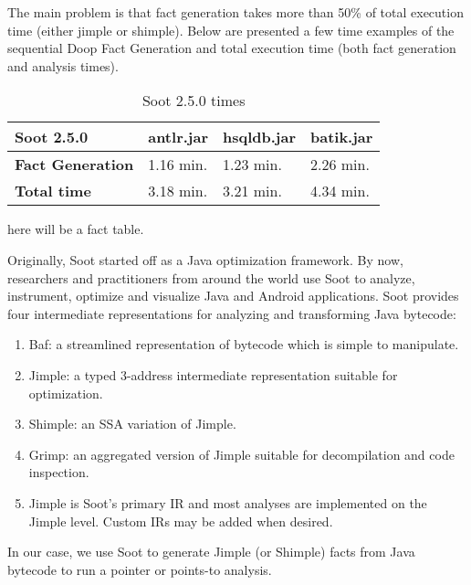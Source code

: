 \documentclass{dithesis}
\begin{document}
        The main problem is that fact generation takes more than 50\% of total execution time (either jimple or shimple). Below are presented a few time examples of the sequential Doop Fact Generation and total execution time (both fact generation and analysis times). 

        \begin{table}[H]
            \centering
            \label{my-label}
            \begin{tabular}{llll}
                \hline
                \textbf{Soot 2.5.0}      & \textbf{antlr.jar} & \textbf{hsqldb.jar} & \textbf{batik.jar} \\ \hline
                \textbf{Fact Generation} & 1.16 min.          & 1.23 min.           & 2.26 min.          \\
                \textbf{Total time}      & 3.18 min.          & 3.21 min.           & 4.34 min.          \\ \hline
            \end{tabular}
            \caption{Soot 2.5.0 times}
        \end{table}

    	here will be a fact table.


    Originally, Soot started off as a Java optimization framework. By now, researchers and practitioners from around the world use Soot to analyze, instrument, optimize and visualize Java and Android applications. Soot provides four intermediate representations for analyzing and transforming Java bytecode:
	\begin{enumerate}
		\item Baf: a streamlined representation of bytecode which is simple to manipulate.
		\item Jimple: a typed 3-address intermediate representation suitable for optimization.
		\item Shimple: an SSA variation of Jimple.
		\item Grimp: an aggregated version of Jimple suitable for decompilation and code inspection.
		\item Jimple is Soot’s primary IR and most analyses are implemented on the Jimple level. Custom IRs may be added when desired.
	\end{enumerate}
    In our case, we use Soot to generate Jimple (or Shimple) facts from Java bytecode to run a pointer or points-to analysis.
    \cite{Sable: Soot}
    
\end{document}
